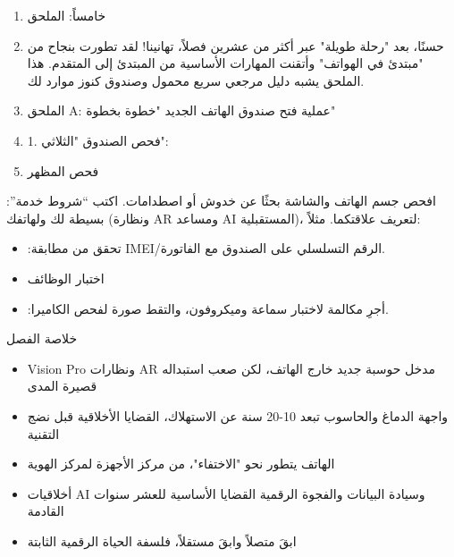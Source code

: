 \begin{enumerate}
  \item خامساً: الملحق
  \item حسنًا، بعد "رحلة طويلة" عبر أكثر من عشرين فصلاً، تهانينا! لقد تطورت بنجاح من "مبتدئ في الهواتف" وأتقنت المهارات الأساسية من المبتدئ إلى المتقدم. هذا الملحق يشبه دليل مرجعي سريع محمول وصندوق كنوز موارد لك.
  \item الملحق A: عملية فتح صندوق الهاتف الجديد "خطوة بخطوة"
  \item 1. فحص الصندوق "الثلاثي":
  \item فحص المظهر
\end{enumerate}

\begin{tcbpractice}{:افحص جسم الهاتف والشاشة بحثًا عن خدوش أو اصطدامات.}
اكتب “شروط خدمة” بسيطة لك ولهاتفك (ونظارة AR ومساعد AI المستقبلية)، لتعريف علاقتكما. مثلاً:

\begin{itemize}
  \item :تحقق من مطابقة IMEI/الرقم التسلسلي على الصندوق مع الفاتورة.
  \item اختبار الوظائف
  \item :أجرِ مكالمة لاختبار سماعة وميكروفون، والتقط صورة لفحص الكاميرا.
\end{itemize}

\end{tcbpractice}

\begin{tcbsummary}{خلاصة الفصل}
\begin{itemize}
  \item Vision Pro ونظارات AR مدخل حوسبة جديد خارج الهاتف، لكن صعب استبداله قصيرة المدى
  \item واجهة الدماغ والحاسوب تبعد 10-20 سنة عن الاستهلاك، القضايا الأخلاقية قبل نضج التقنية
  \item الهاتف يتطور نحو "الاختفاء"، من مركز الأجهزة لمركز الهوية
  \item أخلاقيات AI وسيادة البيانات والفجوة الرقمية القضايا الأساسية للعشر سنوات القادمة
  \item ابقَ متصلاً وابقَ مستقلاً، فلسفة الحياة الرقمية الثابتة
\end{itemize}

\end{tcbsummary}
